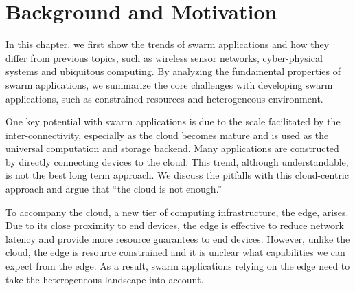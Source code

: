 \documentclass[thesis.tex]{subfiles}
\begin{document}
\chapter{Background and Motivation}
\label{cha:background}

In this chapter, we first show the trends of swarm applications and how they
differ from previous topics, such as wireless sensor networks, cyber-physical
systems and ubiquitous computing. By analyzing the fundamental properties of
swarm applications, we summarize the core challenges with developing swarm
applications, such as constrained resources and heterogeneous environment.

One key potential with swarm applications is due to the scale facilitated by the
inter-connectivity, especially as the cloud becomes mature and is used as the
universal computation and storage backend. Many applications are constructed by
directly connecting devices to the cloud. This trend, although understandable,
is not the best long term approach. We discuss the pitfalls with this
cloud-centric approach and argue that ``the cloud is not enough.''

To accompany the cloud, a new tier of computing infrastructure, the edge,
arises. Due to its close proximity to end devices, the edge is effective to
reduce network latency and provide more resource guarantees to end
devices. However, unlike the cloud, the edge is resource constrained and it is
unclear what capabilities we can expect from the edge. As a result, swarm
applications relying on the edge need to take the heterogeneous landscape into
account.





\end{document}
